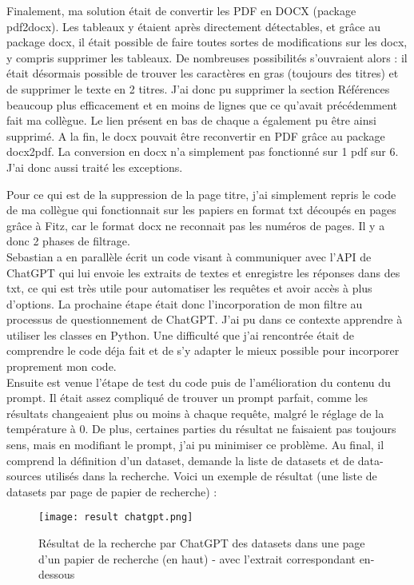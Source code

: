 Finalement, ma solution était de convertir les PDF en DOCX (package pdf2docx). 
Les tableaux y étaient après directement détectables, et grâce au package docx, il était possible de faire toutes sortes de modifications sur les docx, y compris supprimer les tableaux.
De nombreuses possibilités s'ouvraient alors : il était désormais possible de trouver les caractères en gras (toujours des titres) et de supprimer le texte en 2 titres.
J'ai donc pu supprimer la section Références beaucoup plus efficacement et en moins de lignes que ce qu'avait précédemment fait ma collègue.
Le lien présent en bas de chaque a également pu être ainsi supprimé.
A la fin, le docx pouvait être reconvertir en PDF grâce au package docx2pdf.
La conversion en docx n'a simplement pas fonctionné sur 1 pdf sur 6. J'ai donc aussi traité les exceptions.

Pour ce qui est de la suppression de la page titre, j'ai simplement repris le code de ma collègue qui fonctionnait sur les papiers en format txt découpés en pages grâce à Fitz, car le format docx ne reconnait pas les numéros de pages. 
Il y a donc 2 phases de filtrage.
\\

Sebastian a en parallèle écrit un code visant à communiquer avec l'API de ChatGPT qui lui envoie les extraits de textes et enregistre les réponses dans des txt, ce qui est très utile pour automatiser les requêtes et avoir accès à plus d'options.
La prochaine étape était donc l'incorporation de mon filtre au processus de questionnement de ChatGPT.
J'ai pu dans ce contexte apprendre à utiliser les classes en Python.
Une difficulté que j'ai rencontrée était de comprendre le code déja fait et de s'y adapter le mieux possible pour incorporer proprement mon code.
\\

Ensuite est venue l'étape de test du code puis de l'amélioration du contenu du prompt.
Il était assez compliqué de trouver un prompt parfait, comme les résultats changeaient plus ou moins à chaque requête, malgré le réglage de la température à 0.
De plus, certaines parties du résultat ne faisaient pas toujours sens, mais en modifiant le prompt, j'ai pu minimiser ce problème.
Au final, il comprend la définition d'un dataset, demande la liste de datasets et de data-sources utilisés dans la recherche.
Voici un exemple de résultat (une liste de datasets par page de papier de recherche) :

\begin{figure}[H]
    \centering
    \texttt{[image: result chatgpt.png]}
    \caption{Résultat de la recherche par ChatGPT des datasets dans une page d'un papier de recherche (en haut) - avec l'extrait correspondant en-dessous}
\end{figure}

